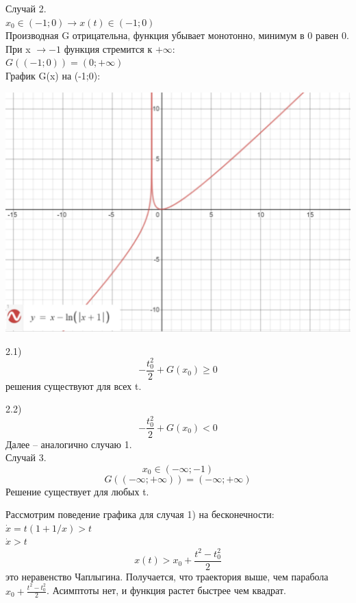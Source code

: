\documentclass[10pt]{report}
\begin{document}
Случай 2.\\
$x_0 \in (-1; 0) \rightarrow x(t) \in (-1; 0)$\\ 
 Производная G отрицательна, функция убывает монотонно, минимум в 0 равен 0. При x $\rightarrow -1$ функция стремится к  $+\infty$:\\
$G((-1; 0))  = (0; +\infty)$ \\

График G(x) на (-1;0):
\begin{center}
{\includegraphics[scale=0.5]{graph2.4.png}} 
\end{center}

2.1) \[-\frac {t_0^2} 2 +G(x_0) \ge 0\] решения существуют для всех t.

2.2) \[-\frac {t_0^2} 2 +G(x_0) < 0\]  
Далее -- аналогично случаю 1.\\

Случай 3.
\[ 
x_0 \in (-\infty; -1) \]
\[
G((-\infty; +\infty))=(-\infty; +\infty)
\]
Решение существует для любых t.

Рассмотрим поведение графика для случая 1) на бесконечности:\\
$\dot{x}=t(1+1/x)>t$\\
 $\dot{x}>t$\\
\[x(t) > x_0 + \frac {t^2-t_0^2} 2 \] 
это неравенство Чаплыгина. Получается, что траектория выше, чем парабола $x_0 + \frac {t^2-t_0^2} 2$. Асимптоты нет, и функция растет быстрее чем квадрат. 
\end{document}
